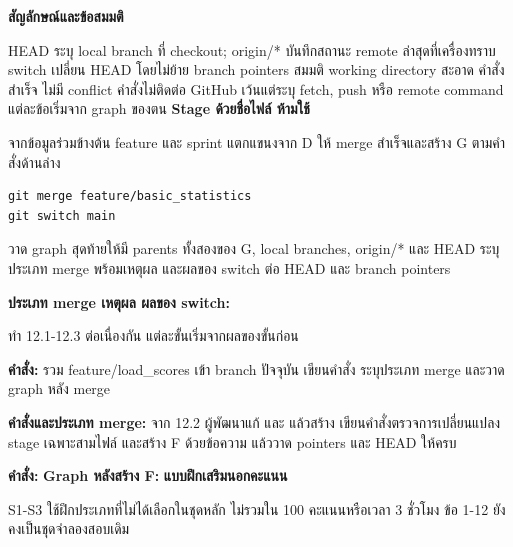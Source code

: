 \textbf{สัญลักษณ์และข้อสมมติ}\par
HEAD ระบุ local branch ที่ checkout; origin/* บันทึกสถานะ remote ล่าสุดที่เครื่องทราบ switch เปลี่ยน HEAD โดยไม่ย้าย branch pointers สมมติ working directory สะอาด คำสั่งสำเร็จ ไม่มี conflict คำสั่งไม่ติดต่อ GitHub เว้นแต่ระบุ fetch, push หรือ remote command แต่ละข้อเริ่มจาก graph ของตน \textbf{Stage ด้วยชื่อไฟล์ ห้ามใช้ }\par

จากข้อมูลร่วมข้างต้น feature และ sprint แตกแขนงจาก D ให้ merge สำเร็จและสร้าง G ตามคำสั่งด้านล่าง\par
\begin{center}\startgitMerge\end{center}
\begin{verbatim}
git merge feature/basic_statistics
git switch main
\end{verbatim}
วาด graph สุดท้ายให้มี parents ทั้งสองของ G, local branches, origin/* และ HEAD ระบุประเภท merge พร้อมเหตุผล และผลของ switch ต่อ HEAD และ branch pointers\par
\blankbox{6cm}
\textbf{ประเภท merge เหตุผล ผลของ switch:}\par
\blankbox{2.5cm}
\newpage
{}
ทำ 12.1-12.3 ต่อเนื่องกัน แต่ละขั้นเริ่มจากผลของขั้นก่อน\par
\begin{center}\startgitFF\end{center}
\textbf{คำสั่ง:}
\blankbox{4.5cm}
รวม feature/load\_scores เข้า branch ปัจจุบัน เขียนคำสั่ง ระบุประเภท merge และวาด graph หลัง merge\par
\par\textbf{คำสั่งและประเภท merge:}
\blankbox{4.5cm}
\newpage
{}
จาก 12.2 ผู้พัฒนาแก้  และ  แล้วสร้าง  เขียนคำสั่งตรวจการเปลี่ยนแปลง stage เฉพาะสามไฟล์ และสร้าง F ด้วยข้อความ  แล้ววาด pointers และ HEAD ให้ครบ\par
\par\textbf{คำสั่ง:}
\blankbox{6cm}
\textbf{Graph หลังสร้าง F:}
\blankbox{10cm}
\ifMockExamSupplements
\newpage
\textbf{\Large แบบฝึกเสริมนอกคะแนน}\par
S1-S3 ใช้ฝึกประเภทที่ไม่ได้เลือกในชุดหลัก ไม่รวมใน 100 คะแนนหรือเวลา 3 ชั่วโมง ข้อ 1-12 ยังคงเป็นชุดจำลองสอบเดิม\par
